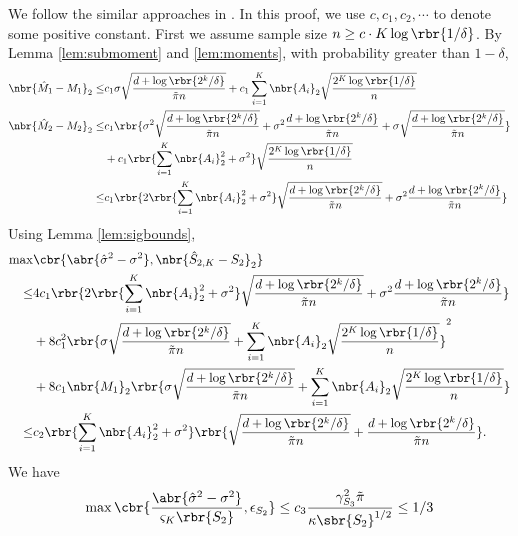 \documentclass[twoside,11pt]{article}
\begin{document}
{  We follow the similar approaches in \cite{HsuKak12}. In this proof, we use $c, c_1, c_2, \cdots$ to denote some positive constant. First we assume sample size $n \geq c \cdot K \log \rbr{1/\delta}$. By Lemma \ref{lem:submoment} and \ref{lem:moments}, with probability greater than $1-\delta$,
  \begin{align}
    \nbr{\hat{M}_1-M_1}_2 \leq& c_1 \sigma \sqrt{ \frac{d+\log\rbr{2^k/\delta}}{\tilde{\pi}n}} + c_1 \sum \limits_{i=1}^K \nbr{A_i}_2 \sqrt{\frac{2^K \log\rbr{1/\delta}}{n}} \\
     \nbr{\hat{M}_2-M_2}_2 \leq
    & c_1\rbr{\sigma^2 \sqrt{ \frac{d+\log\rbr{2^k/\delta}}{\tilde{\pi}n} }+\sigma^2 \frac{d+\log\rbr{2^k/\delta}}{\tilde{\pi}n}+\sigma \sqrt{ \frac{d+\log\rbr{2^k/\delta}}{\tilde{\pi}n} }  } \\
    &+c_1\rbr{  \sum \limits_{i=1}^K \nbr{A_i}_2^2 + \sigma^2} \sqrt{\frac{2^K \log\rbr{1/\delta}}{n}}\\
    \leq& c_1\rbr{ 2\rbr{  \sum \limits_{i=1}^K \nbr{A_i}_2^2 + \sigma^2}  \sqrt{ \frac{d+\log\rbr{2^k/\delta}}{\tilde{\pi}n} }+ \sigma^2 \frac{d+\log\rbr{2^k/\delta}}{\tilde{\pi}n}}
  \end{align}
Using Lemma \ref{lem:sigbounds}, 
  \begin{align}
    \max& \cbr{ \abr{\hat{\sigma}^2-\sigma^2}, \nbr{\hat{S}_{2,K}-S_2}_2  } \nonumber\\
    \leq& 4c_1\rbr{ 2\rbr{  \sum \limits_{i=1}^K \nbr{A_i}_2^2 + \sigma^2}  \sqrt{ \frac{d+\log\rbr{2^k/\delta}}{\tilde{\pi}n} }+ \sigma^2 \frac{d+\log\rbr{2^k/\delta}}{\tilde{\pi}n}} \nonumber\\
    &+ 8c_1^2 \rbr{  \sigma \sqrt{ \frac{d+\log\rbr{2^k/\delta}}{\tilde{\pi}n}} + \sum \limits_{i=1}^K \nbr{A_i}_2 \sqrt{\frac{2^K \log\rbr{1/\delta}}{n}} }^2\nonumber\\
    &+8c_1 \nbr{M_1}_2 \rbr{  \sigma \sqrt{ \frac{d+\log\rbr{2^k/\delta}}{\tilde{\pi}n}} + \sum \limits_{i=1}^K \nbr{A_i}_2 \sqrt{\frac{2^K \log\rbr{1/\delta}}{n}} }\\
    \leq &  c_2\rbr{  \sum \limits_{i=1}^K \nbr{A_i}_2^2 + \sigma^2}\rbr{   \sqrt{ \frac{d+\log\rbr{2^k/\delta}}{\tilde{\pi}n}} +  \frac{d+\log\rbr{2^k/\delta}}{\tilde{\pi}n}}  .
  \end{align}
We have 
\begin{align}
  \max \cbr{\frac{\abr{\hat{\sigma}^2-\sigma^2} }{\varsigma_K\rbr{S_2}}, \epsilon_{S_2} } \leq c_3 \frac{\gamma_{S_3}^2\tilde{\pi}}{\kappa\sbr{S_2}^{1/2}} \leq 1/3
\end{align}
}
\end{document}
